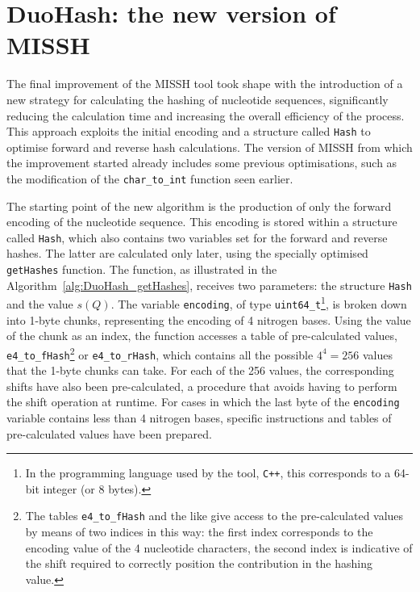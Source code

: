 \section{DuoHash: the new version of MISSH}
\label{sec:DuoHash}

The final improvement of the \acs{MISSH} tool took shape with the introduction of a new strategy for calculating the hashing of nucleotide sequences, significantly reducing the calculation time and increasing the overall efficiency of the process. This approach exploits the initial encoding and a structure called \verb|Hash| to optimise forward and reverse hash calculations. The version of \acs{MISSH} from which the improvement started already includes some previous optimisations, such as the modification of the \verb|char_to_int| function seen earlier.

The starting point of the new algorithm is the production of only the forward encoding of the nucleotide sequence. This encoding is stored within a structure called \verb|Hash|, which also contains two variables set for the forward and reverse hashes. The latter are calculated only later, using the specially optimised \verb|getHashes| function. The function, as illustrated in the Algorithm~\ref{alg:DuoHash_getHashes}, receives two parameters: the structure \verb|Hash| and the value $s(Q)$. The variable \verb|encoding|, of type \verb|uint64_t|\footnote{In the programming language used by the tool, \texttt{C++}, this corresponds to a 64-bit integer (or 8 bytes).}, is broken down into 1-byte chunks, representing the encoding of 4 nitrogen bases. Using the value of the chunk as an index, the function accesses a table of pre-calculated values, \verb|e4_to_fHash|\footnote{The tables \texttt{e4\_to\_fHash} and the like give access to the pre-calculated values by means of two indices in this way: the first index corresponds to the encoding value of the 4 nucleotide characters, the second index is indicative of the shift required to correctly position the contribution in the hashing value.} or \verb|e4_to_rHash|, which contains all the possible $4^4 = 256$ values that the 1-byte chunks can take. For each of the 256 values, the corresponding shifts have also been pre-calculated, a procedure that avoids having to perform the shift operation at runtime. For cases in which the last byte of the \verb|encoding| variable contains less than 4 nitrogen bases, specific instructions and tables of pre-calculated values have been prepared.

